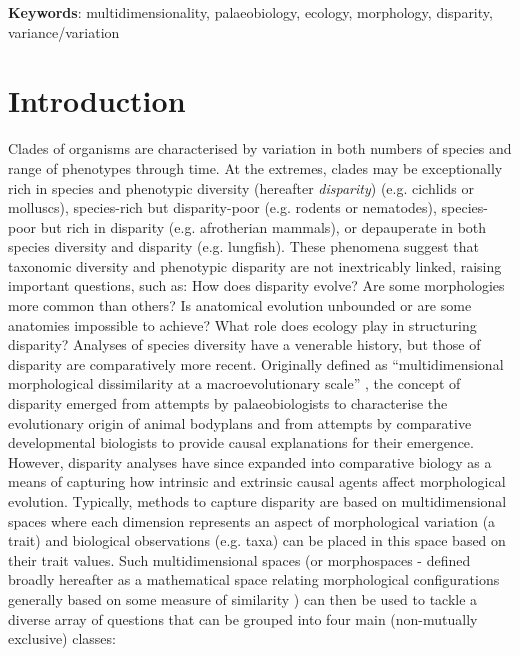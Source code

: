 \documentclass[12pt,letterpaper]{article}
\begin{document}
\textbf{Keywords}: multidimensionality, palaeobiology, ecology, morphology, disparity, variance/variation

\section{Introduction}

\noindent Clades of organisms are characterised by variation in both numbers of species and range of phenotypes through time.
At the extremes, clades may be exceptionally rich in species and phenotypic diversity (hereafter \textit{disparity}) (e.g. cichlids or molluscs), species-rich but disparity-poor (e.g. rodents or nematodes), species-poor but rich in disparity (e.g. afrotherian mammals), or depauperate in both species diversity and disparity (e.g. lungfish).
These phenomena suggest that taxonomic diversity and phenotypic disparity are not inextricably linked, raising important questions, such as: How does disparity evolve? Are some morphologies more common than others? Is anatomical evolution unbounded or are some anatomies impossible to achieve? What role does ecology play in structuring disparity? Analyses of species diversity have a venerable history, but those of disparity are comparatively more recent.
Originally defined as ``multidimensional morphological dissimilarity at a macroevolutionary scale'' \citep{runnegar1987rates,Gould1991}, the concept of disparity emerged from attempts by palaeobiologists to characterise the evolutionary origin of animal bodyplans and from attempts by comparative developmental biologists to provide causal explanations for their emergence.
However, disparity analyses have since expanded into comparative biology as a means of capturing how intrinsic and extrinsic causal agents affect morphological evolution.
Typically, methods to capture disparity are based on multidimensional spaces where each dimension represents an aspect of morphological variation (a trait) and biological observations (e.g. taxa) can be placed in this space based on their trait values.
Such multidimensional spaces (or morphospaces - defined broadly hereafter as a mathematical space relating morphological configurations generally based on some measure of similarity \citep{mitteroecker2009concept}) can then be used to tackle a diverse array of questions that can be grouped into four main (non-mutually exclusive) classes: %
\end{document}
